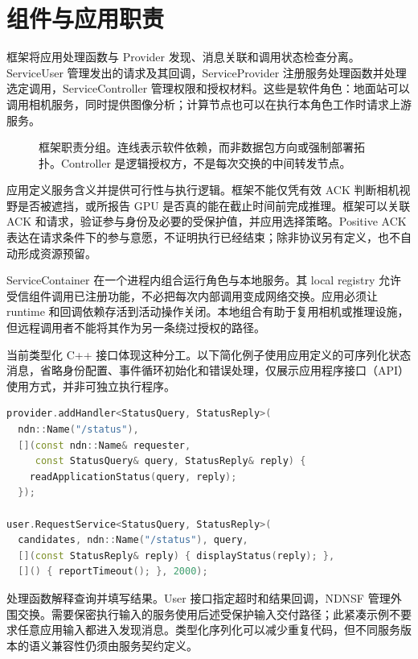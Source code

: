 \section{组件与应用职责}
框架将应用处理函数与 Provider 发现、消息关联和调用状态检查分离。ServiceUser 管理发出的请求及其回调，ServiceProvider 注册服务处理函数并处理选定调用，ServiceController 管理权限和授权材料。这些是软件角色：地面站可以调用相机服务，同时提供图像分析；计算节点也可以在执行本角色工作时请求上游服务。

\begin{figure}[htbp]\singlespacing\centering
{}
\caption{框架职责分组。连线表示软件依赖，而非数据包方向或强制部署拓扑。Controller 是逻辑授权方，不是每次交换的中间转发节点。}
\end{figure}

应用定义服务含义并提供可行性与执行逻辑。框架不能仅凭有效 ACK 判断相机视野是否被遮挡，或所报告 GPU 是否真的能在截止时间前完成推理。框架可以关联 ACK 和请求，验证参与身份及必要的受保护值，并应用选择策略。Positive ACK 表达在请求条件下的参与意愿，不证明执行已经结束；除非协议另有定义，也不自动形成资源预留。

ServiceContainer 在一个进程内组合运行角色与本地服务。其 local registry 允许受信组件调用已注册功能，不必把每次内部调用变成网络交换。应用必须让 runtime 和回调依赖存活到活动操作关闭。本地组合有助于复用相机或推理设施，但远程调用者不能将其作为另一条绕过授权的路径。

当前类型化 C++ 接口体现这种分工。以下简化例子使用应用定义的可序列化状态消息，省略身份配置、事件循环初始化和错误处理，仅展示应用程序接口（API）使用方式，并非可独立执行程序。
\begin{lstlisting}[language=C++,caption={紧凑状态服务的类型化注册与调用。}]
provider.addHandler<StatusQuery, StatusReply>(
  ndn::Name("/status"),
  [](const ndn::Name& requester,
     const StatusQuery& query, StatusReply& reply) {
    readApplicationStatus(query, reply);
  });

user.RequestService<StatusQuery, StatusReply>(
  candidates, ndn::Name("/status"), query,
  [](const StatusReply& reply) { displayStatus(reply); },
  []() { reportTimeout(); }, 2000);
\end{lstlisting}

处理函数解释查询并填写结果。User 接口指定超时和结果回调，NDNSF 管理外围交换。需要保密执行输入的服务使用后述受保护输入交付路径；此紧凑示例不要求任意应用输入都进入发现消息。类型化序列化可以减少重复代码，但不同服务版本的语义兼容性仍须由服务契约定义。
